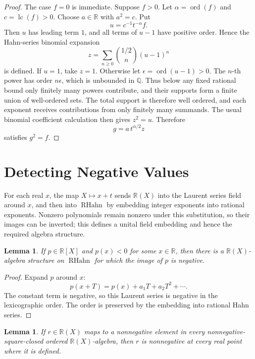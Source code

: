 \documentclass[uplatex,dvipdfmx]{jsarticle}
\newcommand{\Poly}{\mathbb{R}[X]}
\newcommand{\Frac}{\mathbb{R}(X)}
\newcommand{\RationalHahn}{\operatorname{RHahn}}
\newcommand{\lc}{\operatorname{lc}}
\newcommand{\ord}{\operatorname{ord}}
\theoremstyle{matrixsosdefinition}
\newtheorem{lemma}[theorem]{Lemma}
\begin{document}
\begin{proof}
  The case \(f=0\) is immediate. Suppose \(f>0\). Let \(\alpha=\ord(f)\) and
  \(c=\lc(f)>0\). Choose \(a\in\mathbb{R}\) with \(a^2=c\). Put
  \[
    u=c^{-1}t^{-\alpha}f.
  \]
  Then \(u\) has leading term \(1\), and all terms of \(u-1\) have positive
  order. Hence the Hahn-series binomial expansion
  \[
    z=\sum_{n\ge0}\binom{1/2}{n}(u-1)^n
  \]
  is defined.  If \(u=1\), take \(z=1\).  Otherwise let
  \(\epsilon=\ord(u-1)>0\).  The \(n\)-th power has order \(n\epsilon\),
  which is unbounded in \(\mathbb Q\).  Thus below any fixed rational bound
  only finitely many powers contribute, and their supports form a finite
  union of well-ordered sets.  The total support is therefore well ordered,
  and each exponent receives contributions from only finitely many summands. The usual binomial
  coefficient calculation then gives \(z^2=u\). Therefore
  \[
    g=a\,t^{\alpha/2}z
  \]
  satisfies \(g^2=f\).
\end{proof}

\section{Detecting Negative Values}

For each real \(x\), the map \(X\mapsto x+t\) sends \(\Frac\) into the Laurent
series field around \(x\), and then into \(\RationalHahn\) by embedding integer
exponents into rational exponents.  Nonzero polynomials remain nonzero
under this substitution, so their images can be inverted; this defines a
unital field embedding and hence the required algebra structure.

\begin{lemma}\label{lem:negative-polynomial-hahn-en}
  If \(p\in\Poly\) and \(p(x)<0\) for some \(x\in\mathbb{R}\), then there is a
  \(\Frac\)-algebra structure on \(\RationalHahn\) for which the image of \(p\)
  is negative.
\end{lemma}

\begin{proof}
  Expand \(p\) around \(x\):
  \[
    p(x+T)=p(x)+a_1T+a_2T^2+\cdots.
  \]
  The constant term is negative, so this Laurent series is negative in the
  lexicographic order. The order is preserved by the embedding into rational
  Hahn series.
\end{proof}

\begin{lemma}\label{lem:nonneg-in-all-extensions-implies-nonneg-where-defined-en}
  If \(r\in\Frac\) maps to a nonnegative element in every nonnegative-square-closed ordered
  \(\Frac\)-algebra, then \(r\) is nonnegative at every real point where it is
  defined.
\end{lemma}
\end{document}
